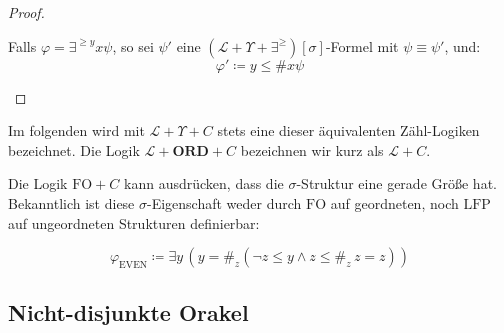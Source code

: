 \begin{proof}
\begin{casenv}
\item Falls $\varphi=\exists^{\geqslant y}x\psi$, so sei $\psi'$ eine
$\left(\mathcal{L}+\Upsilon+\exists^{\geqslant}\right)\left[\sigma\right]$-Formel
mit $\psi\equiv\psi'$, und:
\[
\varphi'\coloneqq y\leqslant\#x\psi
\]
\end{casenv}
\end{proof}
\begin{notation}
Im folgenden wird mit $\mathcal{L}+\Upsilon+C$ stets eine dieser
äquivalenten Zähl-Logiken bezeichnet. Die Logik $\mathcal{L}+\mathbf{ORD}+C$
bezeichnen wir kurz als $\mathcal{L}+C$.
\end{notation}
\begin{example}
Die Logik $\mathrm{FO}+C$ kann ausdrücken, dass die $\sigma$-Struktur
eine gerade Größe hat. Bekanntlich ist diese $\sigma$-Eigenschaft
weder durch $\mathrm{FO}$ auf geordneten, noch $\mathrm{LFP}$ auf
ungeordneten Strukturen definierbar\cite{EbbinghausFlum,Libkin2012}:

\[
\varphi_{\mathrm{EVEN}}\coloneqq\exists y\,\left(y=\#_{z}\left(\neg z\leqslant y\wedge z\leqslant\#_{z}\,z=z\right)\right)
\]
\end{example}

\subsection{Nicht-disjunkte Orakel}

